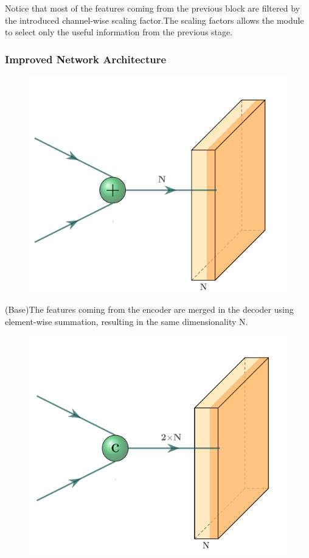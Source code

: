 \documentclass[11pt]{article}
\begin{document}
Notice that most of the features coming from the previous block are filtered by the introduced channel-wise scaling factor.The scaling factors allows the module to select only the useful information from the previous stage.

\subsubsection{Improved Network Architecture}
\begin{figure}[H]
	\centering
	\includegraphics[scale = 0.4]{63}
\end{figure}
(Base)The features coming from the encoder are merged in the decoder using element-wise summation, resulting in the same dimensionality N.
\begin{figure}[H]
	\centering
	\includegraphics[scale = 0.4]{64}
\end{figure}
\end{document}
